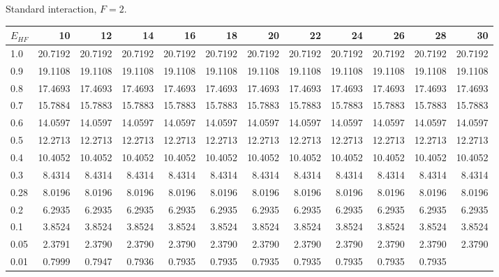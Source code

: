 \begin{landscape}
\begin{table}
\begin{center}
Standard interaction, $F=2$.\\
\begin{tabular}{l|rrrrrrrrrrr}
\hline 
$E_{HF}$ & 10 & 12 & 14 & 16 & 18 & 20 & 22 & 24 & 26 & 28 & 30 \\
\hline \hline
1.0 & 20.7192 & 20.7192 & 20.7192 & 20.7192 & 20.7192 & 20.7192 & 20.7192 & 20.7192 & 20.7192 & 20.7192 & 20.7192 \\ 
0.9 & 19.1108 & 19.1108 & 19.1108 & 19.1108 & 19.1108 & 19.1108 & 19.1108 & 19.1108 & 19.1108 & 19.1108 & 19.1108 \\ 
0.8 & 17.4693 & 17.4693 & 17.4693 & 17.4693 & 17.4693 & 17.4693 & 17.4693 & 17.4693 & 17.4693 & 17.4693 & 17.4693 \\ 
0.7 & 15.7884 & 15.7883 & 15.7883 & 15.7883 & 15.7883 & 15.7883 & 15.7883 & 15.7883 & 15.7883 & 15.7883 & 15.7883 \\ 
0.6 & 14.0597 & 14.0597 & 14.0597 & 14.0597 & 14.0597 & 14.0597 & 14.0597 & 14.0597 & 14.0597 & 14.0597 & 14.0597 \\ 
0.5 & 12.2713 & 12.2713 & 12.2713 & 12.2713 & 12.2713 & 12.2713 & 12.2713 & 12.2713 & 12.2713 & 12.2713 & 12.2713 \\ 
0.4 & 10.4052 & 10.4052 & 10.4052 & 10.4052 & 10.4052 & 10.4052 & 10.4052 & 10.4052 & 10.4052 & 10.4052 & 10.4052 \\ 
0.3 & 8.4314 & 8.4314 & 8.4314 & 8.4314 & 8.4314 & 8.4314       &  8.4314 &  8.4314 &  8.4314 &  8.4314 &  8.4314 \\ 
0.28 & 8.0196 & 8.0196 & 8.0196 & 8.0196 & 8.0196 & 8.0196      &  8.0196 &  8.0196 &  8.0196 &  8.0196 &  8.0196 \\ 
0.2 & 6.2935 & 6.2935 & 6.2935 & 6.2935 & 6.2935 & 6.2935       &  6.2935 &  6.2935 &  6.2935 &  6.2935 &  6.2935 \\ 
0.1 & 3.8524 & 3.8524 & 3.8524 & 3.8524 & 3.8524 & 3.8524       &  3.8524 &  3.8524 &  3.8524 &  3.8524 &  3.8524 \\ 
0.05 & 2.3791 & 2.3790 & 2.3790 & 2.3790 & 2.3790 & 2.3790      &  2.3790 &  2.3790 &  2.3790 &  2.3790 &  2.3790 \\ 
0.01 & 0.7999 & 0.7947 & 0.7936 & 0.7935 & 0.7935 & 0.7935      &  0.7935 &  0.7935 &  0.7935 &  0.7935 &    \\ 
\hline \hline
\end{tabular}
\end{center}

\end{table}
\end{landscape}
